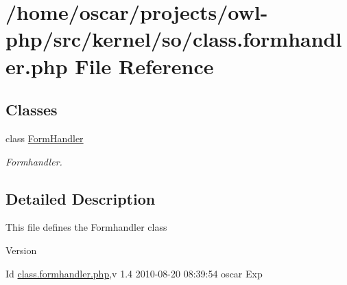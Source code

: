 \section{/home/oscar/projects/owl-\/php/src/kernel/so/class.formhandler.php File Reference}
\label{class_8formhandler_8php}
\subsection*{Classes}
\begin{DoxyCompactItemize}
\item 
class \hyperlink{classFormHandler}{FormHandler}
\begin{DoxyCompactList}\small\item\em Formhandler. \item\end{DoxyCompactList}\end{DoxyCompactItemize}


\subsection{Detailed Description}
This file defines the Formhandler class \begin{DoxyVersion}{Version}

\end{DoxyVersion}
\begin{DoxyParagraph}{Id}
\hyperlink{class_8formhandler_8php}{class.formhandler.php},v 1.4 2010-\/08-\/20 08:39:54 oscar Exp 
\end{DoxyParagraph}
